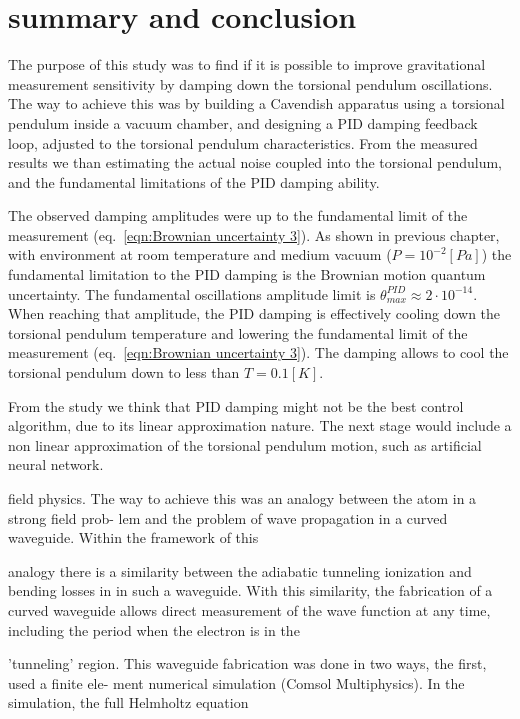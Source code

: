 \documentclass[\main/master.tex]{subfiles}
\begin{document}
\chapter{summary and conclusion}\label{chp:summary and conclusion}
The purpose of this study was to find if it is possible to improve gravitational measurement sensitivity by damping down the torsional pendulum oscillations. The way to achieve this was by building a Cavendish apparatus using a torsional pendulum inside a vacuum chamber, and designing a PID damping feedback loop, adjusted to the torsional pendulum characteristics. From the measured results we than estimating the actual noise coupled into the torsional pendulum, and the fundamental limitations of the PID damping ability.
\par\noindent
The observed damping amplitudes were up to the fundamental limit of the measurement (eq.~\ref{eqn:Brownian uncertainty 3}). As shown in previous chapter, with environment at room temperature and medium vacuum ($P=10^{-2}[Pa]$) the fundamental limitation to the PID damping is the Brownian motion quantum uncertainty. The fundamental oscillations amplitude limit is $\theta_{max}^{PID}\approx 2\cdot 10^{-14}$. When reaching that amplitude, the PID damping is effectively cooling down the torsional pendulum temperature and lowering the fundamental limit of the measurement (eq.~\ref{eqn:Brownian uncertainty 3}). The damping allows to cool the torsional pendulum down to less than $T=0.1[K]$.
\par\noindent
From the study we think that PID damping might not be the best control algorithm, due to its linear approximation nature. The next stage would include a non linear approximation of the torsional pendulum motion, such as artificial neural network. 


field physics. The way to achieve this was an analogy between the atom in a strong field prob-
lem and the problem of wave propagation in a curved waveguide. Within the framework of this

analogy there is a similarity between the adiabatic tunneling ionization and bending losses in
in such a waveguide. With this similarity, the fabrication of a curved waveguide allows direct
measurement of the wave function at any time, including the period when the electron is in the

’tunneling’ region. This waveguide fabrication was done in two ways, the first, used a finite ele-
ment numerical simulation (Comsol Multiphysics). In the simulation, the full Helmholtz equation
\end{document}
